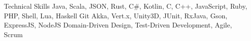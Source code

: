 
\begin{rubric}{Technical Skills}
	Java, Scala, JSON, Rust, C\#, Kotlin, C, C++, JavaScript, Ruby, PHP, Shell, Lua, Haskell
	Git
	Akka, Vert.x, Unity3D, JUnit, RxJava, Gson, ExpressJS, NodeJS
	Domain-Driven Design, Test-Driven Development, Agile, Scrum
\end{rubric}
